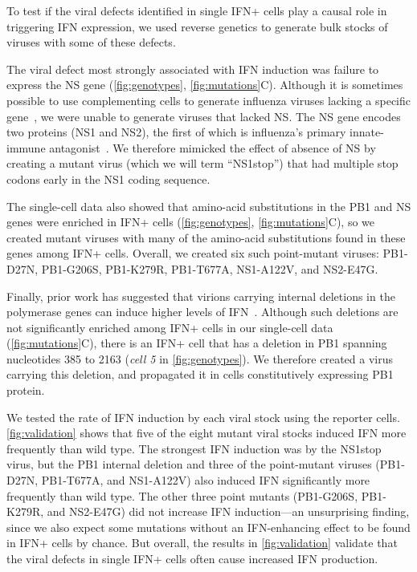 \documentclass[10pt,letterpaper]{article}
\newcommand{\FIG}[1]{\autoref{fig:#1}}
\begin{document}
To test if the viral defects identified in single IFN+ cells play a causal role in triggering IFN expression, we used reverse genetics to generate bulk stocks of viruses with some of these defects.

The viral defect most strongly associated with IFN induction was failure to express the NS gene (\FIG{genotypes}, \FIG{mutations}C).
Although it is sometimes possible to use complementing cells to generate influenza viruses lacking a specific gene~\cite{fujii2003selective,marsh2007specific}, we were unable to generate viruses that lacked NS.
The NS gene encodes two proteins (NS1 and NS2), the first of which is influenza's primary innate-immune antagonist~\cite{garcia1998influenza, hale2008multifunctional}.
We therefore mimicked the effect of absence of NS by creating a mutant virus (which we will term ``NS1stop'') that had multiple stop codons early in the NS1 coding sequence.

The single-cell data also showed that amino-acid substitutions in the PB1 and NS genes were enriched in IFN+ cells (\FIG{genotypes}, \FIG{mutations}C), so we created mutant viruses with many of the amino-acid substitutions found in these genes among IFN+ cells.
Overall, we created six such point-mutant viruses: PB1-D27N, PB1-G206S, PB1-K279R, PB1-T677A, NS1-A122V, and NS2-E47G.

Finally, prior work has suggested that virions carrying internal deletions in the polymerase genes can induce higher levels of IFN~\cite{baum2010preference, tapia2013defective, boergeling2015evidence, dimmock2015cloned}.
Although such deletions are not significantly enriched among IFN+ cells in our single-cell data (\FIG{mutations}C), there is an IFN+ cell that has a deletion in PB1 spanning nucleotides 385 to 2163 (\textit{cell 5} in \FIG{genotypes}).
We therefore created a virus carrying this deletion, and propagated it in cells constitutively expressing PB1 protein.

We tested the rate of IFN induction by each viral stock using the reporter cells.
\FIG{validation} shows that five of the eight mutant viral stocks induced IFN more frequently than wild type.
The strongest IFN induction was by the NS1stop virus, but the PB1 internal deletion and three of the point-mutant viruses (PB1-D27N, PB1-T677A, and NS1-A122V) also induced IFN significantly more frequently than wild type.
The other three point mutants (PB1-G206S, PB1-K279R, and NS2-E47G) did not increase IFN induction---an unsurprising finding, since we also expect some mutations without an IFN-enhancing effect to be found in IFN+ cells by chance.
But overall, the results in \FIG{validation} validate that the viral defects in single IFN+ cells often cause increased IFN production.
\end{document}
